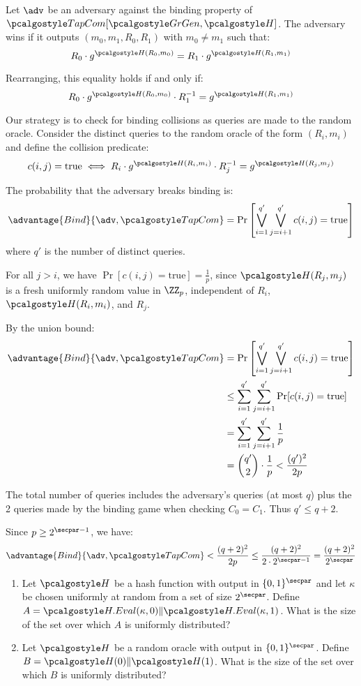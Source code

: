 \ifsolutions
\begin{mysolution}
  Let $\adv$ be an adversary against the binding property of $\algo{TapCom}[\grgen, \algo{H}]$. The adversary wins if it outputs $(m_0, m_1, R_0, R_1)$ with $m_0 \neq m_1$ such that:
  \[
  R_0 \cdot g^{\algo{H}(R_0, m_0)} = R_1 \cdot g^{\algo{H}(R_1, m_1)}
  \]

  Rearranging, this equality holds if and only if:
  \[
  R_0 \cdot g^{\algo{H}(R_0, m_0)} \cdot R_1^{-1} = g^{\algo{H}(R_1, m_1)}
  \]

  Our strategy is to check for binding collisions as queries are made to the random oracle.
  Consider the distinct queries to the random oracle of the form $(R_i, m_i)$ and define the collision predicate:
  \[
  c(i, j) = \text{true} \iff R_i \cdot g^{\algo{H}(R_i, m_i)} \cdot R_j^{-1} = g^{\algo{H}(R_j, m_j)}
  \]
  
  The probability that the adversary breaks binding is:
  \[
  \advantage{Bind}{\adv, \algo{TapCom}} = \Pr\left[\bigvee_{i=1}^{q'} \bigvee_{j=i+1}^{q'} c(i,j) = \text{true}\right]
  \]
  where $q'$ is the number of distinct queries.
  
  For all $j > i$, we have $\Pr[c(i,j) = \text{true}] = \frac{1}{p}$, since $\algo{H}(R_j, m_j)$ is a fresh uniformly random value in $\ZZ_p$, independent of $R_i$, $\algo{H}(R_i, m_i)$, and $R_j$.
  
  By the union bound:
  \begin{align*}
    \advantage{Bind}{\adv, \algo{TapCom}} &= \Pr\left[\bigvee_{i=1}^{q'} \bigvee_{j=i+1}^{q'} c(i,j) = \text{true}\right] \\
    &\leq \sum_{i=1}^{q'} \sum_{j=i+1}^{q'} \Pr[c(i,j) = \text{true}] \\
    &= \sum_{i=1}^{q'} \sum_{j=i+1}^{q'} \frac{1}{p} \\
    &= \binom{q'}{2} \cdot \frac{1}{p} < \frac{(q')^2}{2p}
  \end{align*}
  
  The total number of queries includes the adversary's queries (at most $q$) plus the 2 queries made by the binding game when checking $C_0 = C_1$. Thus $q' \leq q + 2$.
  
  Since $p \geq 2^{\secpar-1}$, we have:
  \[
  \advantage{Bind}{\adv, \algo{TapCom}} < \frac{(q+2)^2}{2p} \leq \frac{(q+2)^2}{2 \cdot 2^{\secpar-1}} = \frac{(q+2)^2}{2^\secpar}
  \]
\end{mysolution}
\fi

\begin{exercise}[Optional]
  \begin{enumerate}
    \item Let $\algo{H}$ be a hash function with output in $\{0,1\}^\secpar$ and let $\kappa$ be chosen uniformly at random from a set of size $2^\secpar$. Define $A = \algo{H.Eval}(\kappa, 0) \| \algo{H.Eval}(\kappa, 1)$. What is the size of the set over which $A$ is uniformly distributed?
    \item Let $\algo{H}$ be a random oracle with output in $\{0,1\}^\secpar$. Define $B = \algo{H}(0) \| \algo{H}(1)$. What is the size of the set over which $B$ is uniformly distributed?
  \end{enumerate}
\end{exercise}

